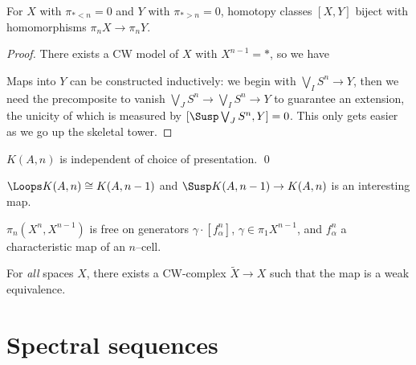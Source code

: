\begin{lemma}
For $X$ with $\pi_{* < n} = 0$ and $Y$ with $\pi_{* > n} = 0$, homotopy classes $[X, Y]$ biject with homomorphisms $\pi_n X \to \pi_n Y$.
\end{lemma}
\begin{proof}
There exists a CW model of $X$ with $X^{n-1} = *$, so we have
\begin{center}
\end{center}
Maps into $Y$ can be constructed inductively: we begin with $\bigvee_I S^n \to Y$, then we need the precomposite to vanish $\bigvee_J S^n \to \bigvee_I S^n \to Y$ to guarantee an extension, the unicity of which is measured by $[\Susp \bigvee_J S^n, Y] = 0$.  This only gets easier as we go up the skeletal tower.
\end{proof}

\begin{corollary}
$K(A, n)$ is independent of choice of presentation. \qed
\end{corollary}

\begin{remark}
$\Loops K(A, n) \cong K(A, n-1)$ and $\Susp K(A, n-1) \to K(A, n)$ is an interesting map.
\end{remark}

\begin{remark}
$\pi_n(X^n, X^{n-1})$ is free on generators $\gamma \cdot [f^n_\alpha]$, $\gamma \in \pi_1 X^{n-1}$, and $f^n_\alpha$ a characteristic map of an $n$--cell.
\end{remark}

\begin{remark}
For \emph{all} spaces $X$, there exists a CW-complex $\widetilde X \to X$ such that the map is a weak equivalence.
\end{remark}




\section{Spectral sequences}

